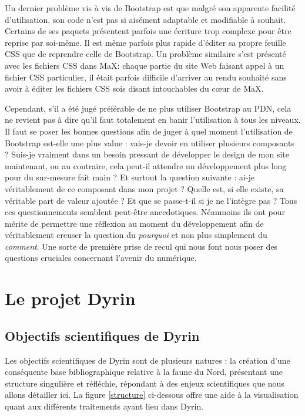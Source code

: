 \documentclass[a4paper,12pt,twoside]{book}
\begin{document}
 Un dernier problème vis à vis de Bootstrap est que malgré son apparente facilité d'utilisation, son code n'est pas si aisément adaptable et modifiable à souhait. Certains de ses paquets présentent parfois une écriture trop complexe pour être reprise par soi-même. Il est même parfois plus rapide d'éditer sa propre feuille CSS que de reprendre celle de Bootstrap. Un problème similaire s'est présenté avec les fichiers CSS dans MaX: chaque partie du site Web faisant appel à un fichier CSS particulier, il était parfois difficile d'arriver au rendu souhaité sans avoir à éditer les fichiers CSS sois disant intouchables du \og c\oe{}ur\fg{} de MaX.


Cependant, s'il a été jugé préférable de ne plus utiliser Bootstrap au \acrshort{PDN}, cela ne revient pas à dire qu'il faut totalement en banir l'utilisation à tous les niveaux. Il faut se poser les bonnes questions afin de juger à quel moment l'utilisation de Bootstrap est-elle une plus value : vais-je devoir en utiliser plusieurs composants ? Suis-je vraiment dans un besoin pressant de développer le design de mon site maintenant, ou au contraire, cela peut-il attendre un développement plus long pour du sur-mesure fait main ? Et surtout la question suivante : ai-je véritablement de ce composant dans mon projet ? Quelle est, si elle existe, sa véritable part de valeur ajoutée ? Et que se passe-t-il si je ne l'intègre pas ? Tous ces questionnements semblent peut-être anecdotiques. Néanmoins ils ont pour mérite de permettre une réflexion au moment du développement afin de véritablement creuser la question du \textit{pourquoi} et non plus simplement du \textit{comment}. Une sorte de première prise de recul qui nous font nous poser des questions cruciales concernant l'avenir du numérique.

\part{Le projet Dyrin}

\chapter{Objectifs scientifiques de Dyrin}
Les objectifs scientifiques de Dyrin sont de plusieurs natures : la création d'une conséquente base bibliographique relative à la faune du Nord, présentant une structure singulière et réfléchie, répondant à des enjeux scientifiques que nous allons détailler ici. La figure \ref{structure} ci-dessous offre une aide à la visualisation quant aux différents traitements ayant lieu dans Dyrin.
\end{document}
